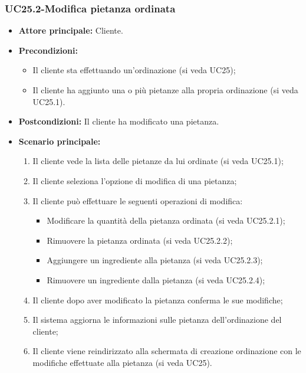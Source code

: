\subsubsection{UC25.2-Modifica pietanza ordinata}
\begin{itemize}
\item \textbf{Attore principale:} Cliente.
\item \textbf{Precondizioni:} 
\begin{itemize}
    \item Il cliente sta effettuando un'ordinazione (si veda UC25);
    \item Il cliente ha aggiunto una o più pietanze alla propria ordinazione (si veda UC25.1).
\end{itemize}
\item \textbf{Postcondizioni:} Il cliente ha modificato una pietanza.
\item \textbf{Scenario principale:}
\begin{enumerate}
    \item Il cliente vede la lista delle pietanze da lui ordinate (si veda UC25.1);
    \item Il cliente seleziona l'opzione di modifica di una pietanza;
    \item Il cliente può effettuare le seguenti operazioni di modifica:
    \begin{itemize}
        \item Modificare la quantità della pietanza ordinata (si veda UC25.2.1);
        \item Rimuovere la pietanza ordinata (si veda UC25.2.2);
        \item Aggiungere un ingrediente alla pietanza (si veda UC25.2.3);
        \item Rimuovere un ingrediente dalla pietanza (si veda UC25.2.4);
    \end{itemize}
    \item Il cliente dopo aver modificato la pietanza conferma le sue modifiche;
    \item Il sistema aggiorna le informazioni sulle pietanza dell'ordinazione del cliente;
    \item Il cliente viene reindirizzato alla schermata di creazione ordinazione con le modifiche effettuate alla pietanza (si veda UC25).
\end{enumerate}
\end{itemize}


